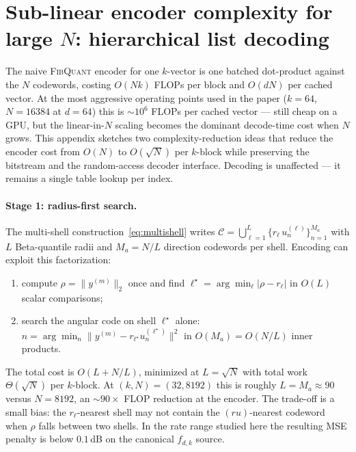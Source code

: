 \documentclass{article}
\theoremstyle{definition}
\theoremstyle{remark}
\begin{document}
\section{Sub-linear encoder complexity for large \texorpdfstring{$N$}{N}: hierarchical list decoding}
\label{app:list_decoding}

The naive \textsc{FibQuant} encoder for one $k$-vector is one
batched dot-product against the $N$ codewords, costing $O(N k)$
FLOPs per block and $O(d N)$ per cached vector.  At the most
aggressive operating points used in the paper ($k = 64$, $N = 16384$
at $d = 64$) this is $\sim 10^{6}$ FLOPs per cached vector --- still
cheap on a GPU, but the linear-in-$N$ scaling becomes the dominant
decode-time cost when $N$ grows.  This appendix sketches two
complexity-reduction ideas that reduce the encoder cost from $O(N)$
to $O(\sqrt N)$ per $k$-block while preserving the bitstream and
the random-access decoder interface.  Decoding is unaffected --- it
remains a single table lookup per index.

\paragraph{Stage 1: radius-first search.}
The multi-shell construction~\eqref{eq:multishell} writes
$\mathcal{C} = \bigcup_{\ell = 1}^{L}\{r_\ell\, u_n^{(\ell)}\}_{n = 1}^{M_a}$
with $L$ Beta-quantile radii and $M_a = N / L$ direction codewords
per shell.  Encoding can exploit this factorization:
\begin{enumerate}
\item compute $\rho = \|y^{(m)}\|_2$ once and find
$\ell^\star = \arg\min_\ell |\rho - r_\ell|$ in $O(L)$ scalar
comparisons;
\item search the angular code on shell $\ell^\star$ alone:
$\hat n = \arg\min_n \|y^{(m)} - r_{\ell^\star} u_n^{(\ell^\star)}\|^2$
in $O(M_a) = O(N / L)$ inner products.
\end{enumerate}
The total cost is $O(L + N / L)$, minimized at $L = \sqrt N$ with
total work $\Theta(\sqrt N)$ per $k$-block.  At $(k, N) = (32,
8192)$ this is roughly $L = M_a \approx 90$ versus $N = 8192$, an
$\sim 90\times$ FLOP reduction at the encoder.  The trade-off is a
small bias: the $r_\ell$-nearest shell may not contain the
$(r u)$-nearest codeword when $\rho$ falls between two shells.  In
the rate range studied here the resulting MSE penalty is below
$0.1$\,dB on the canonical $f_{d, k}$ source.
\end{document}
